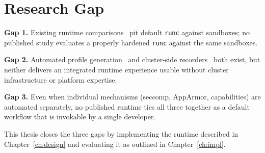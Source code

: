 \section{Research Gap}

\textbf{Gap 1.} Existing runtime comparisons~\cite{wang2022,volpert2024,viktorsson2020} pit default \texttt{runc} against sandboxes; no published study evaluates a properly hardened \texttt{runc} against the same sandboxes.

\textbf{Gap 2.} Automated profile generation~\cite{lopes2020,canella2021} and cluster-side recorders~\cite{spo2025,inspektorgadget2025} both exist, but neither delivers an integrated runtime experience usable without cluster infrastructure or platform expertise.

\textbf{Gap 3.} Even when individual mechanisms (seccomp, AppArmor, capabilities) are automated separately, no published runtime ties all three together as a default workflow that is invokable by a single developer.

This thesis closes the three gaps by implementing the runtime described in Chapter~\ref{ch:design} and evaluating it as outlined in Chapter~\ref{ch:impl}.
